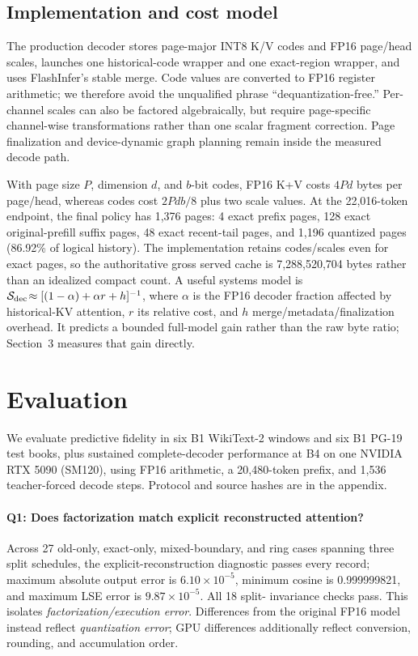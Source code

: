 \documentclass{article}
\begin{document}
\subsection{Implementation and cost model}

The production decoder stores page-major INT8 K/V codes and FP16 page/head
scales, launches one historical-code wrapper and one exact-region wrapper, and
uses FlashInfer's stable merge.  Code values are converted to FP16 register
arithmetic; we therefore avoid the unqualified phrase ``dequantization-free.''
Per-channel scales can also be factored algebraically, but require page-specific
channel-wise transformations rather than one scalar fragment correction.
Page finalization and device-dynamic graph planning remain inside the measured
decode path.

With page size $P$, dimension $d$, and $b$-bit codes, FP16 K+V costs $4Pd$
bytes per page/head, whereas codes cost $2Pdb/8$ plus two scale values.  At the
22,016-token endpoint, the final policy has 1,376 pages: 4 exact prefix pages,
128 exact original-prefill suffix pages, 48 exact recent-tail pages, and 1,196
quantized pages (86.92\% of logical history).  The implementation retains
codes/scales even for exact pages, so the authoritative gross served cache is
7,288,520,704 bytes rather than an idealized compact count.  A useful systems
 model is $\mathcal S_{\rm dec}\!\approx[(1-\alpha)+\alpha r+h]^{-1}$, where $\alpha$ is the FP16
decoder fraction affected by historical-KV attention, $r$ its relative cost,
and $h$ merge/metadata/finalization overhead.  It predicts a bounded full-model
gain rather than the raw byte ratio; Section~3 measures that gain directly.

\section{Evaluation}

We evaluate predictive fidelity in six B1 WikiText-2 windows and six B1 PG-19
test books, plus sustained complete-decoder performance at B4 on one NVIDIA
RTX 5090 (SM120), using FP16 arithmetic, a 20,480-token prefix, and 1,536
teacher-forced decode steps.  Protocol and source hashes are in the appendix.

\paragraph{Q1: Does factorization match explicit reconstructed attention?}
Across 27 old-only, exact-only, mixed-boundary, and ring cases spanning three
split schedules, the explicit-reconstruction diagnostic passes every record;
maximum absolute output error is $6.10\times10^{-5}$, minimum cosine is
0.999999821, and maximum LSE error is $9.87\times10^{-5}$.  All 18 split-
invariance checks pass.  This isolates \emph{factorization/execution error}.
Differences from the original FP16 model instead reflect \emph{quantization
error}; GPU differences additionally reflect conversion, rounding, and
accumulation order.
\end{document}
